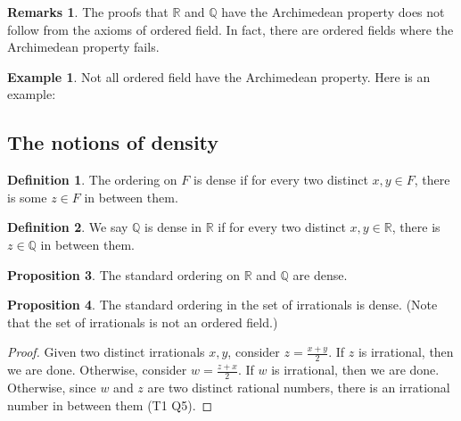 \documentclass[14pt]{article}
\theoremstyle{definition}
\newtheorem*{remark}{Remarks}
\newtheorem*{example}{Example}
\newtheorem{definition}{Definition}[subsection]
\newtheorem{proposition}[definition]{Proposition}
\newcommand{\bb}[1]{\mathbb{#1}}
\begin{document}
\begin{remark}
    The proofs that $\bb{R}$ and $\bb{Q}$ have the Archimedean property does not 
    follow from the axioms of ordered field. In fact, there are ordered fields
    where the Archimedean property fails.
\end{remark}
\begin{example}
    Not all ordered field have the Archimedean property. Here is an example:\\

\end{example}

\vspace{5mm}

\subsection{The notions of density}
\begin{definition}
    The ordering on $F$ is dense if for every two distinct 
    $x,y\in F$, there is some $z\in F$ in between them.
\end{definition}

\vspace{2mm}

\begin{definition}
 We say $\bb{Q}$ is dense in $\bb{R}$ if for every two distinct $x,y\in\bb{R}$, there is 
 $z\in\bb{Q}$ in between them.
\end{definition}

\vspace{2mm}

\begin{proposition}
    The standard ordering on $\bb{R}$ and $\bb{Q}$ are dense.
\end{proposition}

\vspace{2mm}

\begin{proposition}
    The standard ordering in the set of irrationals is dense. (Note that the set of irrationals
    is not an ordered field.)
\end{proposition}

\begin{proof}
    Given two distinct irrationals $x,y$, consider $z=\frac{x+y}{2}$. If $z$ is irrational,
    then we are done. Otherwise, consider $w=\frac{z+x}{2}$. If $w$ is irrational, then
    we are done. Otherwise, since $w$ and $z$ are two distinct rational numbers, there is 
    an irrational number in between them (T1 Q5).
\end{proof}
\end{document}
